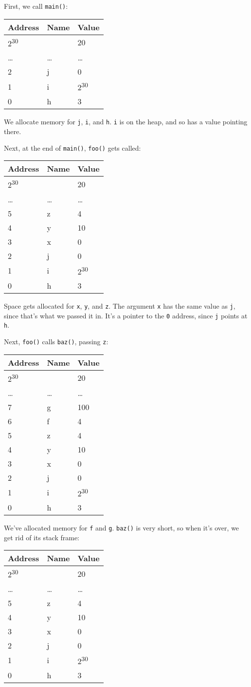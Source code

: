 \documentclass[a4paper,]{book}
\begin{document}
First, we call \texttt{main()}:

\begin{longtable}[c]{@{}lll@{}}
\toprule
Address & Name & Value\tabularnewline
\midrule
\endhead
2\textsuperscript{30} & & 20\tabularnewline
\ldots{} & \ldots{} & \ldots{}\tabularnewline
2 & j & 0\tabularnewline
1 & i & 2\textsuperscript{30}\tabularnewline
0 & h & 3\tabularnewline
\bottomrule
\end{longtable}

We allocate memory for \texttt{j}, \texttt{i}, and \texttt{h}.
\texttt{i} is on the heap, and so has a value pointing there.

Next, at the end of \texttt{main()}, \texttt{foo()} gets called:

\begin{longtable}[c]{@{}lll@{}}
\toprule
Address & Name & Value\tabularnewline
\midrule
\endhead
2\textsuperscript{30} & & 20\tabularnewline
\ldots{} & \ldots{} & \ldots{}\tabularnewline
5 & z & 4\tabularnewline
4 & y & 10\tabularnewline
3 & x & 0\tabularnewline
2 & j & 0\tabularnewline
1 & i & 2\textsuperscript{30}\tabularnewline
0 & h & 3\tabularnewline
\bottomrule
\end{longtable}

Space gets allocated for \texttt{x}, \texttt{y}, and \texttt{z}. The
argument \texttt{x} has the same value as \texttt{j}, since that's what
we passed it in. It's a pointer to the \texttt{0} address, since
\texttt{j} points at \texttt{h}.

Next, \texttt{foo()} calls \texttt{baz()}, passing \texttt{z}:

\begin{longtable}[c]{@{}lll@{}}
\toprule
Address & Name & Value\tabularnewline
\midrule
\endhead
2\textsuperscript{30} & & 20\tabularnewline
\ldots{} & \ldots{} & \ldots{}\tabularnewline
7 & g & 100\tabularnewline
6 & f & 4\tabularnewline
5 & z & 4\tabularnewline
4 & y & 10\tabularnewline
3 & x & 0\tabularnewline
2 & j & 0\tabularnewline
1 & i & 2\textsuperscript{30}\tabularnewline
0 & h & 3\tabularnewline
\bottomrule
\end{longtable}

We've allocated memory for \texttt{f} and \texttt{g}. \texttt{baz()} is
very short, so when it's over, we get rid of its stack frame:

\begin{longtable}[c]{@{}lll@{}}
\toprule
Address & Name & Value\tabularnewline
\midrule
\endhead
2\textsuperscript{30} & & 20\tabularnewline
\ldots{} & \ldots{} & \ldots{}\tabularnewline
5 & z & 4\tabularnewline
4 & y & 10\tabularnewline
3 & x & 0\tabularnewline
2 & j & 0\tabularnewline
1 & i & 2\textsuperscript{30}\tabularnewline
0 & h & 3\tabularnewline
\bottomrule
\end{longtable}
\end{document}
